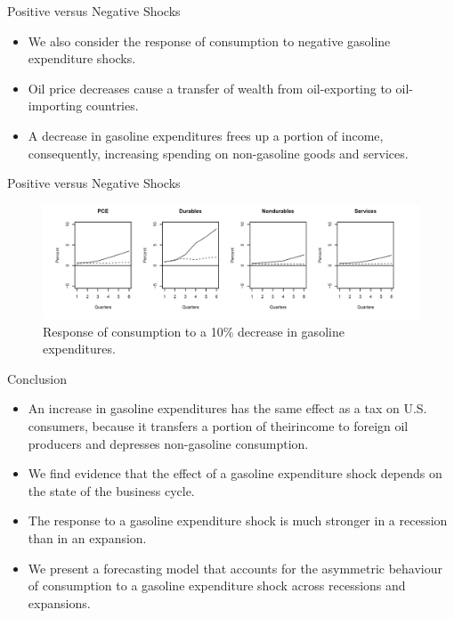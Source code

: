 \documentclass[
  10pt,
  ignorenonframetext,
]{beamer}
\begin{document}
\begin{frame}{Positive versus Negative Shocks}
\protect\hypertarget{positive-versus-negative-shocks}{}

\begin{itemize}
\item
  We also consider the response of consumption to negative gasoline
  expenditure shocks.
\item
  Oil price decreases cause a transfer of wealth from oil-exporting to
  oil-importing countries.
\item
  A decrease in gasoline expenditures frees up a portion of income,
  consequently, increasing spending on non-gasoline goods and services.
\end{itemize}

\end{frame}

\begin{frame}{Positive versus Negative Shocks}
\protect\hypertarget{positive-versus-negative-shocks-1}{}

\begin{figure}
\centering
\includegraphics{Decreases.jpg}
\caption{Response of consumption to a 10\% decrease in gasoline
expenditures.}
\end{figure}

\end{frame}

\begin{frame}{Conclusion}
\protect\hypertarget{conclusion}{}

\begin{itemize}
\item
  An increase in gasoline expenditures has the same effect as a tax on
  U.S. consumers, because it transfers a portion of theirincome to
  foreign oil producers and depresses non-gasoline consumption.
\item
  We find evidence that the effect of a gasoline expenditure shock
  depends on the state of the business cycle.
\item
  The response to a gasoline expenditure shock is much stronger in a
  recession than in an expansion.
\item
  We present a forecasting model that accounts for the asymmetric
  behaviour of consumption to a gasoline expenditure shock across
  recessions and expansions.
\end{itemize}

\end{frame}
\end{document}
